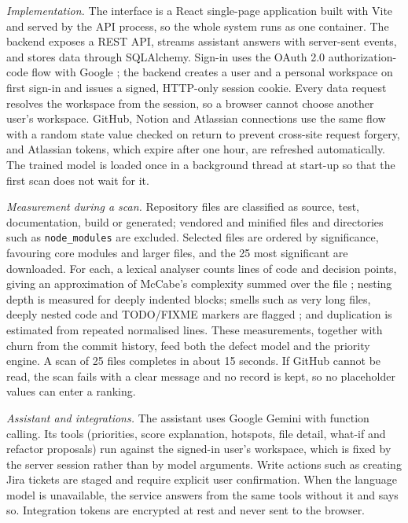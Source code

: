 \documentclass[conference]{IEEEtran}
\begin{document}
\textit{Implementation.} The interface is a React single-page application built with Vite and served by the API process, so the whole system runs as one container. The backend exposes a REST API, streams assistant answers with server-sent events, and stores data through SQLAlchemy. Sign-in uses the OAuth 2.0 authorization-code flow with Google \cite{oauth}; the backend creates a user and a personal workspace on first sign-in and issues a signed, HTTP-only session cookie. Every data request resolves the workspace from the session, so a browser cannot choose another user's workspace. GitHub, Notion and Atlassian connections use the same flow with a random state value checked on return to prevent cross-site request forgery, and Atlassian tokens, which expire after one hour, are refreshed automatically. The trained model is loaded once in a background thread at start-up so that the first scan does not wait for it.

\textit{Measurement during a scan.} Repository files are classified as source, test, documentation, build or generated; vendored and minified files and directories such as \texttt{node\_modules} are excluded. Selected files are ordered by significance, favouring core modules and larger files, and the 25 most significant are downloaded. For each, a lexical analyser counts lines of code and decision points, giving an approximation of McCabe's complexity summed over the file \cite{mccabe}; nesting depth is measured for deeply indented blocks; smells such as very long files, deeply nested code and TODO/FIXME markers are flagged \cite{fowler}; and duplication is estimated from repeated normalised lines. These measurements, together with churn from the commit history, feed both the defect model and the priority engine. A scan of 25 files completes in about 15 seconds. If GitHub cannot be read, the scan fails with a clear message and no record is kept, so no placeholder values can enter a ranking.

\textit{Assistant and integrations.} The assistant uses Google Gemini with function calling. Its tools (priorities, score explanation, hotspots, file detail, what-if and refactor proposals) run against the signed-in user's workspace, which is fixed by the server session rather than by model arguments. Write actions such as creating Jira tickets are staged and require explicit user confirmation. When the language model is unavailable, the service answers from the same tools without it and says so. Integration tokens are encrypted at rest and never sent to the browser.
\end{document}
